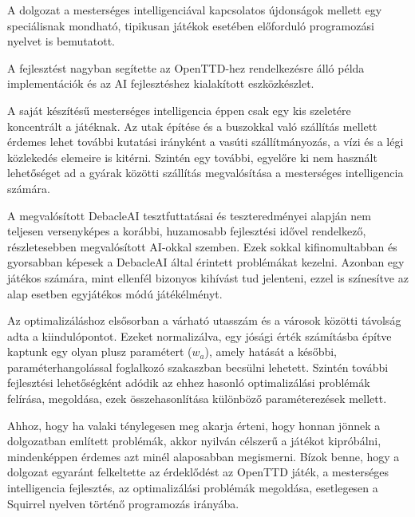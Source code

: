 
A dolgozat a mesterséges intelligenciával kapcsolatos újdonságok mellett egy speciálisnak mondható, tipikusan játékok esetében előforduló programozási nyelvet is bemutatott.

A fejlesztést nagyban segítette az OpenTTD-hez rendelkezésre álló példa implementációk és az AI fejlesztéshez kialakított eszközkészlet.

A saját készítésű mesterséges intelligencia éppen csak egy kis szeletére koncentrált a játéknak. Az utak építése és a buszokkal való szállítás mellett érdemes lehet további kutatási irányként a vasúti szállítmányozás, a vízi és a légi közlekedés elemeire is kitérni. Szintén egy további, egyelőre ki nem használt lehetőséget ad a gyárak közötti szállítás megvalósítása a mesterséges intelligencia számára.

A megvalósított DebacleAI tesztfuttatásai és teszteredményei alapján nem teljesen versenyképes a korábbi, huzamosabb fejlesztési idővel rendelkező, részletesebben megvalósított AI-okkal szemben. Ezek sokkal kifinomultabban és gyorsabban képesek a DebacleAI által érintett problémákat kezelni. Azonban egy játékos számára, mint ellenfél bizonyos kihívást tud jelenteni, ezzel is színesítve az alap esetben egyjátékos módú játékélményt.

Az optimalizáláshoz elsősorban a várható utasszám és a városok közötti távolság adta a kiindulópontot. Ezeket normalizálva, egy jósági érték számításba építve kaptunk egy olyan plusz paramétert ($w_a$), amely hatását a későbbi, paraméterhangolással foglalkozó szakaszban becsülni lehetett. Szintén további fejlesztési lehetőségként adódik az ehhez hasonló optimalizálási problémák felírása, megoldása, ezek összehasonlítása különböző paraméterezések mellett.

Ahhoz, hogy ha valaki ténylegesen meg akarja érteni, hogy honnan jönnek a dolgozatban említett problémák, akkor nyilván célszerű a játékot kipróbálni, mindenképpen érdemes azt minél alaposabban megismerni.
Bízok benne, hogy a dolgozat egyaránt felkeltette az érdeklődést az OpenTTD játék, a mesterséges intelligencia fejlesztés, az optimalizálási problémák megoldása, esetlegesen a Squirrel nyelven történő programozás irányába.
